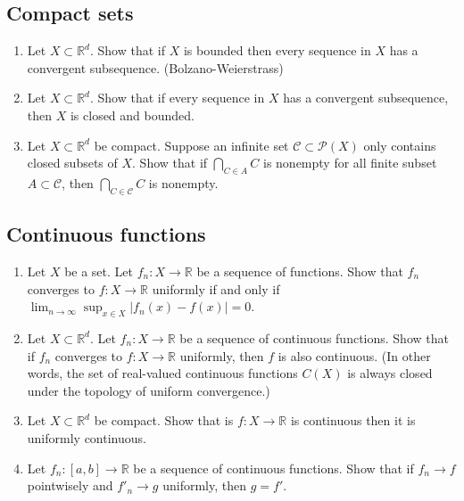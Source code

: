 \documentclass{article}
\def\R{\mathbb{R}}
\begin{document}
\subsection*{Compact sets}
\begin{enumerate}
\item Let $X\subset\R^d$. Show that if $X$ is bounded then every sequence in $X$ has a convergent subsequence. (Bolzano-Weierstrass)
\item Let $X\subset\R^d$. Show that if every sequence in $X$ has a convergent subsequence, then $X$ is closed and bounded.
\item Let $X\subset\R^d$ be compact. Suppose an infinite set $\mathcal{C}\subset\mathcal{P}(X)$ only contains closed subsets of $X$. Show that if $\bigcap_{C\in A}C$ is nonempty for all finite subset $A\subset\mathcal{C}$, then $\bigcap_{C\in\mathcal{C}}C$ is nonempty.
\end{enumerate}

\subsection*{Continuous functions}
\begin{enumerate}
\item Let $X$ be a set. Let $f_n:X\to\R$ be a sequence of functions. Show that $f_n$ converges to $f:X\to\R$ uniformly if and only if $\lim_{n\to\infty}\sup_{x\in X}|f_n(x)-f(x)|=0$.
\item Let $X\subset\R^d$. Let $f_n:X\to\R$ be a sequence of continuous functions. Show that if $f_n$ converges to $f:X\to\R$ uniformly, then $f$ is also continuous. (In other words, the set of real-valued continuous functions $C(X)$ is always closed under the topology of uniform convergence.)
\item Let $X\subset\R^d$ be compact. Show that is $f:X\to\R$ is continuous then it is uniformly continuous.
\item Let $f_n:[a,b]\to\R$ be a sequence of continuous functions. Show that if $f_n\to f$ pointwisely and $f'_n\to g$ uniformly, then $g=f'$.
\end{enumerate}

\clearpage
\end{document}
